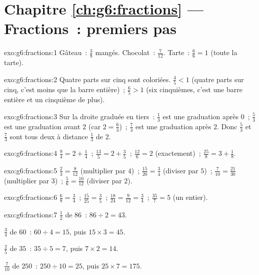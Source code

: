 \section*{Chapitre \ref{ch:g6:fractions} --- Fractions~: premiers pas}

\begin{solution}{exo:g6:fractions:1}
Gâteau~: $\frac38$ mangés. \quad Chocolat~: $\frac{7}{12}$. \quad
Tarte~: $\frac66 = 1$ (toute la tarte).
\end{solution}

\begin{solution}{exo:g6:fractions:2}
Quatre parts sur cinq sont coloriées. $\frac45 < 1$ (quatre parts sur
cinq, c'est moins que la barre entière)~; $\frac65 > 1$ (six cinquièmes,
c'est une barre entière et un cinquième de plus).
\end{solution}

\begin{solution}{exo:g6:fractions:3}
Sur la droite graduée en tiers~: $\frac13$ est une graduation après
$0$~; $\frac53$ est une graduation avant $2$ (car $2 = \frac63$)~;
$\frac73$ est une graduation après $2$. Donc $\frac53$ et $\frac73$
sont tous deux à distance $\frac13$ de $2$.
\end{solution}

\begin{solution}{exo:g6:fractions:4}
$\frac94 = 2 + \frac14$~; \quad
$\frac{13}{5} = 2 + \frac35$~; \quad
$\frac{12}{6} = 2$ (exactement)~; \quad
$\frac{25}{8} = 3 + \frac18$.
\end{solution}

\begin{solution}{exo:g6:fractions:5}
$\frac23 = \frac{8}{12}$ (multiplier par $4$)~; \quad
$\frac{15}{20} = \frac34$ (diviser par $5$)~; \quad
$\frac{7}{10} = \frac{21}{30}$ (multiplier par $3$)~; \quad
$\frac56 = \frac{10}{12}$ (diviser par $2$).
\end{solution}

\begin{solution}{exo:g6:fractions:6}
$\frac68 = \frac34$~; \quad
$\frac{15}{25} = \frac35$~; \quad
$\frac{18}{24} = \frac{9}{12} = \frac34$~; \quad
$\frac{35}{7} = 5$ (un entier).
\end{solution}

\begin{solution}{exo:g6:fractions:7}
$\frac12$ de $86$~: $86 \div 2 = 43$.

$\frac34$ de $60$~: $60 \div 4 = 15$, puis $15 \times 3 = 45$.

$\frac25$ de $35$~: $35 \div 5 = 7$, puis $7 \times 2 = 14$.

$\frac{7}{10}$ de $250$~: $250 \div 10 = 25$, puis $25 \times 7 = 175$.
\end{solution}

